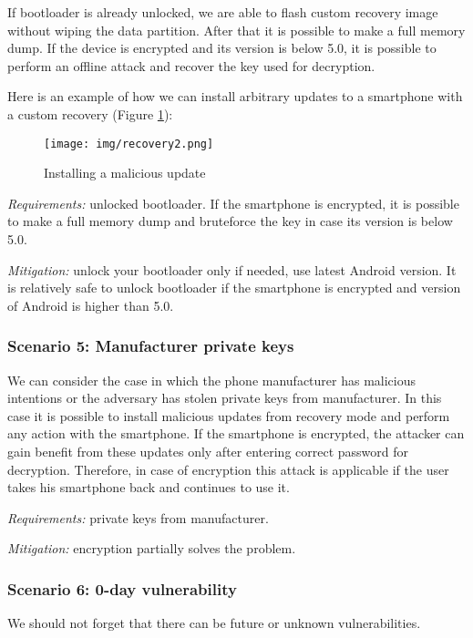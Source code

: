 If bootloader is already unlocked, we are able to flash custom recovery image without wiping the data partition. After that it is possible to make a full memory dump. If the device is encrypted and its version is below 5.0, it is possible to perform an offline attack and recover the key used for decryption.

Here is an example of how we can install arbitrary updates to a smartphone with a custom recovery (Figure \ref{pic:bad_upd}):

\begin{figure}[!ht]
\centering
\texttt{[image: img/recovery2.png]}
\caption{Installing a malicious update}
\label{pic:bad_upd}
\end{figure}


\textsl{Requirements:} unlocked bootloader. If the smartphone is encrypted, it is possible to make a full memory dump and bruteforce the key in case its version is below 5.0.

\textsl{Mitigation:} unlock your bootloader only if needed, use latest Android version. It is relatively safe to unlock bootloader if the smartphone is encrypted and version of Android is higher than 5.0.


\subsubsection{Scenario 5: Manufacturer private keys}

We can consider the case in which the phone manufacturer has malicious intentions or the adversary has stolen private keys from manufacturer. In this case it is possible to install malicious updates from recovery mode and perform any action with the smartphone. If the smartphone is encrypted, the attacker can gain benefit from these updates only after entering correct password for decryption. Therefore, in case of encryption this attack is applicable if the user takes his smartphone back and continues to use it.



\textsl{Requirements:} private keys from manufacturer.

\textsl{Mitigation:} encryption partially solves the problem.


\subsubsection{Scenario 6: 0-day vulnerability}

We should not forget that there can be future or unknown vulnerabilities.


